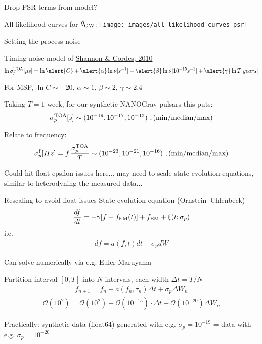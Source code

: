 \documentclass[10pt]{beamer}
\begin{document}
\begin{frame}{Drop PSR terms from model?}
	
	All likelihood curves for $\bar{\theta}_{\rm GW}$:
	\texttt{[image: images/all\_likelihood\_curves\_psr]}
	
\end{frame}





\begin{frame}{Setting the process noise}
	
	
Timing noise model of \href{https://arxiv.org/abs/1010.4794}{Shannon \& Cordes, 2010}
\begin{eqnarray}
 \ln \sigma_p^{\rm TOA} [\mu s] = \ln \alert{C} + \alert{\alpha} \ln \nu [s^{-1}] + \alert{\beta} \ln \dot{\nu} [10^{-15} s^{-2}] + \alert{\gamma} \ln T [years]
\end{eqnarray}

For MSP, $\ln C \sim -20$, $\alpha \sim 1$, $\beta\sim2$, $\gamma \sim 2.4$

Taking $T = 1$ week, for our synthetic NANOGrav pulsars this puts:	 $$\sigma_p^{\rm TOA}  [s] \sim (10^{-19}, 10^{-17}, 10^{-13}) \, \, , \text{(min/median/max)}$$ 

Relate to frequency:
$$ \sigma_p^{\rm f} [Hz] = f \, \frac{\sigma_p^{\rm TOA}}{T}  \sim (10^{-23}, 10^{-21}, 10^{-16}) \, \, , \text{(min/median/max)}$$

Could hit float epsilon issues here... may need to scale state evolution equations, similar to heterodyning the measured data...

\end{frame}




\begin{frame}{Rescaling to avoid float issues}
	State evolution equation (Ornstein–Uhlenbeck)
	\begin{eqnarray}
		\frac{df}{dt}= -\gamma [f - f_{\rm EM}(t)] + \dot{f}_{\rm EM} + \xi(t; \sigma_p)
	\end{eqnarray}
i.e. 
		\begin{eqnarray}
		df = a(f,t) dt + \sigma_p dW
	\end{eqnarray}

Can solve numerically via e.g. Euler-Maruyama

Partition interval $[0,T]$ into $N$ intervals, each width $\Delta t = T/N$ 
\begin{eqnarray}
	f_{n+1} = f_{n} + a(f_n, \tau_n) \Delta t + \sigma_p \Delta W_n
\end{eqnarray}
\begin{eqnarray}
		\mathcal{O}(10^2) = \mathcal{O}(10^2) + \mathcal{O}(10^{-15}) \cdot \Delta t  + \mathcal{O}(10^{-20}) \Delta W_n
\end{eqnarray}

Practically: synthetic data (float64) generated with e.g. $\sigma_p = 10^{-19}$ = data with e.g. $\sigma_p = 10^{-20}$ 

	
\end{frame}
\end{document}

